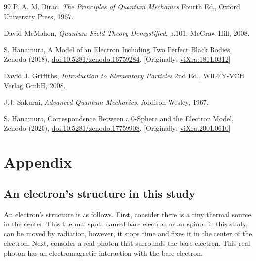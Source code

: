 \documentclass[%
 reprint,
 amsmath,amssymb,
 aps,
]{revtex4-1}
\numberwithin{equation}{section}%
\begin{document}
\begin{thebibliography}{99}
     P. A. M. Dirac, \textit{The Principles of Quantum Mechanics} Fourth Ed., Oxford University Press, 1967.
    
    
     David McMahon, \textit{Quantum Field Theory Demystified}, p.101, McGraw-Hill, 2008.
    
     S. Hanamura, A Model of an Electron Including Two Perfect Black Bodies, Zenodo (2018), \href{https://doi.org/10.5281/zenodo.16759284}{doi:10.5281/zenodo.16759284}. [Originally: \href{http://vixra.org/abs/1811.0312}{viXra:1811.0312}]
    
     David J. Griffiths, \textit{Introduction to Elementary Particles} 2nd Ed., WILEY-VCH Verlag GmbH, 2008.
    
     J.J. Sakurai, \textit{Advanced Quantum Mechanics}, Addison Wesley, 1967.
    
     S. Hanamura, Correspondence Between a 0-Sphere and the Electron Model, Zenodo (2020), \href{https://doi.org/10.5281/zenodo.17759908}{doi:10.5281/zenodo.17759908}. [Originally: \href{https://vixra.org/abs/2001.0610}{viXra:2001.0610}]
\end{thebibliography}

\section{Appendix}
\label{Appendix}

\subsection{An electron’s structure in this study}
\label{An electron’s structure in this study}

        An electron's structure is as follows. First, consider there is a tiny thermal source in the center. This thermal spot, named bare electron or an spinor in this study, can be moved by radiation, however, it stops time and fixes it in the center of the electron. Next, consider a real photon that surrounds the bare electron. This real photon has an electromagnetic interaction with the bare electron.
\end{document}
